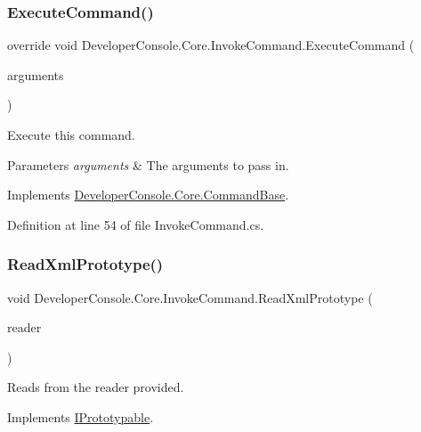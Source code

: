 \subsubsection{\texorpdfstring{Execute\+Command()}{ExecuteCommand()}}
{\footnotesize\ttfamily override void Developer\+Console.\+Core.\+Invoke\+Command.\+Execute\+Command (\begin{DoxyParamCaption}\item[{string}]{arguments }\end{DoxyParamCaption})\hspace{0.3cm}{\ttfamily [virtual]}}



Execute this command. 


\begin{DoxyParams}{Parameters}
{\em arguments} & The arguments to pass in. \\
\hline
\end{DoxyParams}


Implements \hyperlink{class_developer_console_1_1_core_1_1_command_base_ab68054239b7e3d2a47029839f90d59ca}{Developer\+Console.\+Core.\+Command\+Base}.



Definition at line 54 of file Invoke\+Command.\+cs.

\mbox{\label{class_developer_console_1_1_core_1_1_invoke_command_a0d75a4414c49b069138f270a492754ee}} 
\subsubsection{\texorpdfstring{Read\+Xml\+Prototype()}{ReadXmlPrototype()}}
{\footnotesize\ttfamily void Developer\+Console.\+Core.\+Invoke\+Command.\+Read\+Xml\+Prototype (\begin{DoxyParamCaption}\item[{Xml\+Reader}]{reader }\end{DoxyParamCaption})}



Reads from the reader provided. 



Implements \hyperlink{interface_i_prototypable_a024d752c4be655a7166db5718f1fad6a}{I\+Prototypable}.



